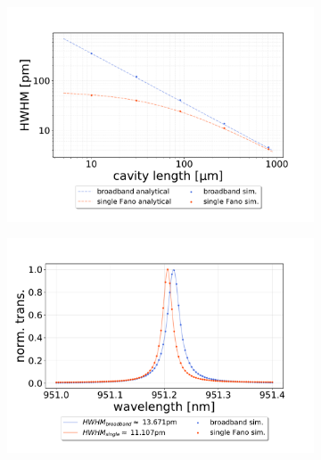 \begin{figure}[h!]
    \centering
    \begin{subfigure}[c]{0.7\textwidth}
        \centering
        \includegraphics[width=\textwidth]{figures/HWHM_broadband_vs_single_sim.pdf}
        \caption{}
        \label{fig:HWHM_broadband_vs_single_fano}
    \end{subfigure}
    \begin{subfigure}[c]{0.49\textwidth}
        \includegraphics[width=\textwidth]{figures/sim_single_vs_broadband_270um.pdf}
        \caption{}
        \label{fig:270um_broadband_and_single_fano_peak}
    \end{subfigure}
    \begin{subfigure}[c]{0.49\textwidth}

\end{subfigure}
\end{figure}

